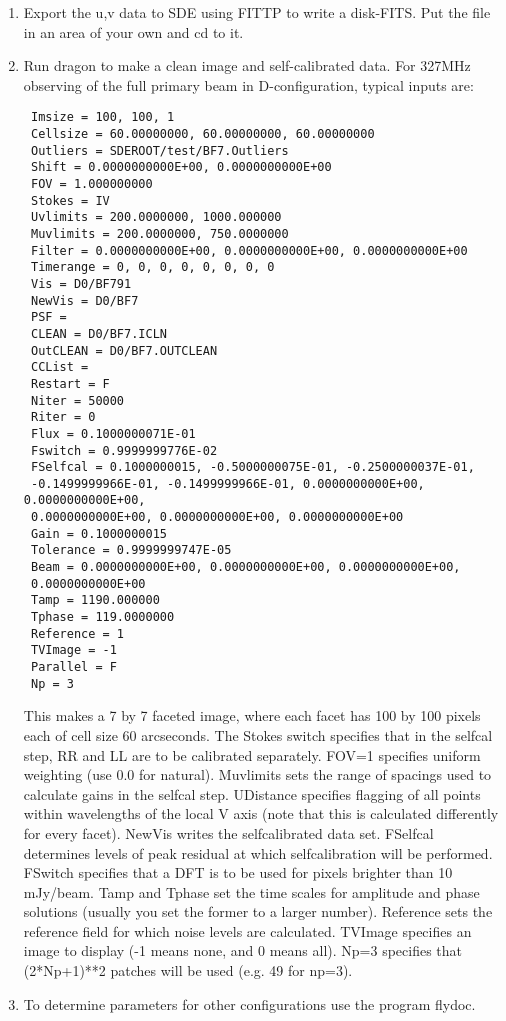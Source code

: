 \begin{enumerate}

\item Export the u,v data to SDE using FITTP to write a disk-FITS.
Put the file in an area of your own and cd to it. 

\item Run dragon to make a clean image and self-calibrated 
data. For 327MHz observing of the full primary beam in
D-configuration, typical inputs are:

\begin{verbatim}
 Imsize = 100, 100, 1
 Cellsize = 60.00000000, 60.00000000, 60.00000000
 Outliers = SDEROOT/test/BF7.Outliers
 Shift = 0.0000000000E+00, 0.0000000000E+00
 FOV = 1.000000000
 Stokes = IV
 Uvlimits = 200.0000000, 1000.000000
 Muvlimits = 200.0000000, 750.0000000
 Filter = 0.0000000000E+00, 0.0000000000E+00, 0.0000000000E+00
 Timerange = 0, 0, 0, 0, 0, 0, 0, 0
 Vis = D0/BF791
 NewVis = D0/BF7
 PSF =
 CLEAN = D0/BF7.ICLN
 OutCLEAN = D0/BF7.OUTCLEAN
 CCList =
 Restart = F
 Niter = 50000
 Riter = 0
 Flux = 0.1000000071E-01
 Fswitch = 0.9999999776E-02
 FSelfcal = 0.1000000015, -0.5000000075E-01, -0.2500000037E-01,
 -0.1499999966E-01, -0.1499999966E-01, 0.0000000000E+00, 0.0000000000E+00,
 0.0000000000E+00, 0.0000000000E+00, 0.0000000000E+00
 Gain = 0.1000000015
 Tolerance = 0.9999999747E-05
 Beam = 0.0000000000E+00, 0.0000000000E+00, 0.0000000000E+00,
 0.0000000000E+00
 Tamp = 1190.000000
 Tphase = 119.0000000
 Reference = 1
 TVImage = -1
 Parallel = F
 Np = 3
\end{verbatim}

This makes a 7 by 7 faceted image, where each facet has 100 by 100
pixels each of cell size 60 arcseconds. The Stokes switch specifies
that in the selfcal step, RR and LL are to be calibrated separately.
FOV=1 specifies uniform weighting (use 0.0 for natural). Muvlimits
sets the range of spacings used to calculate gains in the selfcal
step. UDistance specifies flagging of all points within wavelengths of
the local V axis (note that this is calculated differently for every
facet). NewVis writes the selfcalibrated data set.  FSelfcal
determines levels of peak residual at which selfcalibration will be
performed. FSwitch specifies that a DFT is to be used for pixels
brighter than 10 mJy/beam. Tamp and Tphase set the time scales for
amplitude and phase solutions (usually you set the former to a larger
number). Reference sets the reference field for which noise levels are
calculated. TVImage specifies an image to display (-1 means none, and
0 means all). Np=3 specifies that (2*Np+1)**2 patches will be used
(e.g. 49 for np=3).

\item To determine parameters for other configurations use the
program flydoc.

\end{enumerate}



